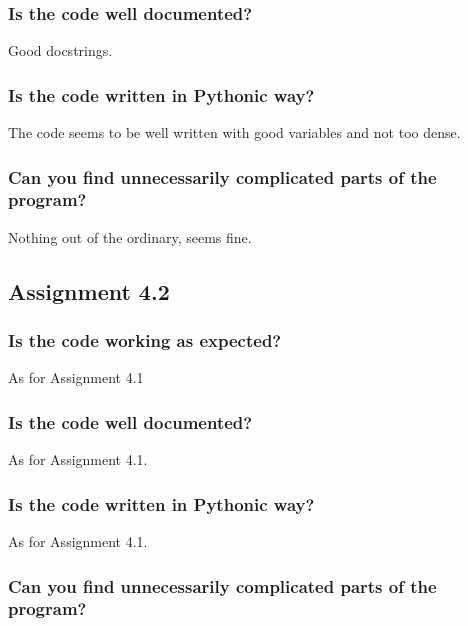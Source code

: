 \documentclass[a4paper]{article}
\begin{document}
\subsubsection*{Is the code well documented?}

Good docstrings.

\subsubsection*{Is the code written in Pythonic way?}

The code seems to be well written with good variables and not too dense.

\subsubsection*{Can you find unnecessarily complicated parts of the program?}

Nothing out of the ordinary, seems fine.



\subsection*{Assignment 4.2} \label{sec:assignment5.2}

\subsubsection*{Is the code working as expected?}

As for Assignment 4.1

\subsubsection*{Is the code well documented?}

As for Assignment 4.1.

\subsubsection*{Is the code written in Pythonic way?}

As for Assignment 4.1.

\subsubsection*{Can you find unnecessarily complicated parts of the program?}
\end{document}

